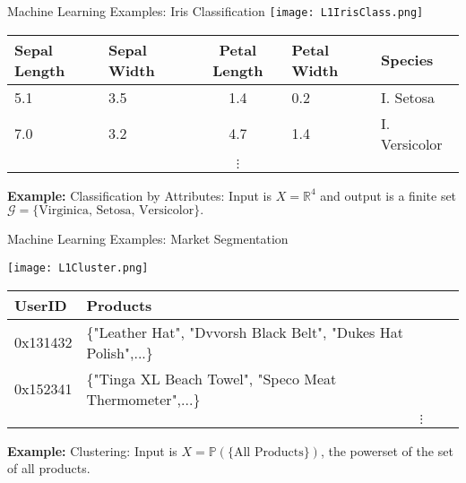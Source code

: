 \documentclass[10pt, handout]{beamer}
\begin{document}
\begin{frame}[fragile]{Machine Learning Examples: Iris Classification}
\texttt{[image: L1IrisClass.png]}

\begin{tabular}{llcll}
\textbf{Sepal Length} & \textbf{Sepal Width} & \textbf{Petal Length} & \textbf{Petal Width} & \textbf{Species}\\ \hline
 	5.1 &	3.5 &	1.4 &	0.2 &	I. Setosa         \\ \hline
7.0 	& 3.2  &	4.7 &	1.4 &	I. Versicolor         \\ \hline
&&$\vdots$
\end{tabular}


\textbf{Example:} Classification by Attributes: 
Input is $X = \mathbb{R}^4$ and output is a finite set $\mathcal{G} = \{\text{Virginica, Setosa, Versicolor}\}.$
\end{frame}







\begin{frame}[fragile]{Machine Learning Examples: Market Segmentation}
\begin{center}
\texttt{[image: L1Cluster.png]}
\end{center}
\begin{tabular}{llcll}
\textbf{UserID} & \textbf{Products} \\ \hline
0x131432 & \{"Leather Hat", "Dvvorsh Black Belt", "Dukes Hat Polish",...\}  \\ \hline
0x152341 & \{"Tinga XL Beach Towel", "Speco Meat Thermometer",...\}     \\ \hline
&&$\vdots$
\end{tabular}


\textbf{Example:} Clustering: 
Input is $X = \mathbb{P}(\{\text{All Products}\})$, the powerset of the set of all products. 
\end{frame}
\end{document}
